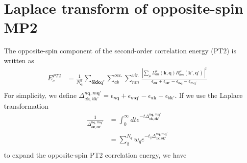 \documentclass[a4paper,12pt]{article}
\begin{document}

%
%
\section{Laplace transform of opposite-spin MP2}
The opposite-spin component of the second-order correlation energy (PT2) is written as
\begin{equation}
    \begin{split}
		E_{c}^{PT2}&=\frac{1}{N_{\boldsymbol{q}}^3}\sum_{\boldsymbol{\delta k}\boldsymbol{k}\boldsymbol{q}'}
		\sum_{ab}^{occ.}\sum_{nm}^{vir.}
		\frac{\left|\sum_{\mu}L_{an}^{\mu}(\boldsymbol{k},\boldsymbol{q})R_{bm}^{\mu}(\boldsymbol{k}',\boldsymbol{q}')\right|^2}
        {\epsilon_{a\boldsymbol{k}}+\epsilon_{b\boldsymbol{k}'}-\epsilon_{n\boldsymbol{q}}-\epsilon_{m\boldsymbol{q}'}}\\
    \end{split}
\end{equation}
For simplicity, we define $\Delta_{a\boldsymbol{k},b\boldsymbol{k}'}^{n\boldsymbol{q},m\boldsymbol{q}'}=
\epsilon_{n\boldsymbol{q}}+\epsilon_{m\boldsymbol{q}'}-\epsilon_{a\boldsymbol{k}}-\epsilon_{b\boldsymbol{k}'}$.
If we use the Laplace transformation 
\begin{equation}
	\begin{split}
	    \frac {1} {\Delta_{a\boldsymbol{k},b\boldsymbol{k}'}^{n\boldsymbol{q},m\boldsymbol{q}'}}
	    &= \int_0^{\infty}dt e^{-t\Delta_{a\boldsymbol{k},b\boldsymbol{k}'}^{n\boldsymbol{q},m\boldsymbol{q}'}}\\
		&= \sum_{q}^{N_{q}}w_{q} e^{-t_q\Delta_{a\boldsymbol{k},b\boldsymbol{k}'}^{n\boldsymbol{q},m\boldsymbol{q}'}}\\
	\end{split}
\end{equation}
to expand the opposite-spin PT2 correlation energy, we have
\end{document}
